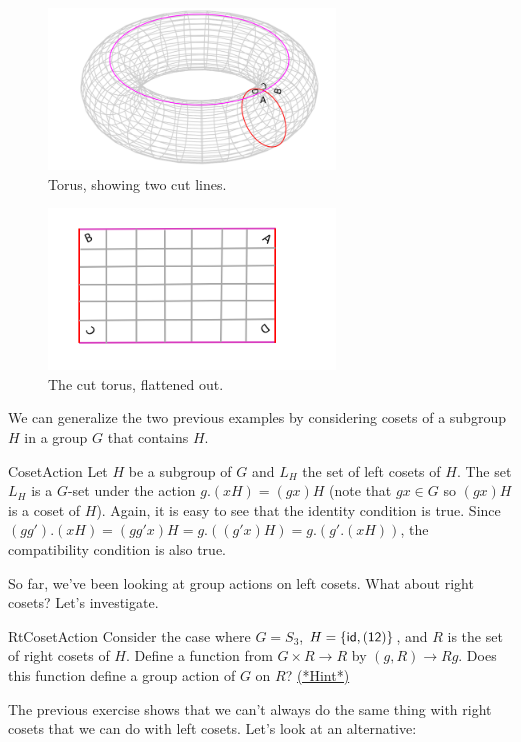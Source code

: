 \begin{figure}[ht]
\begin{center}
\includegraphics[width=3in]{images/Torus1.png}
\caption{Torus, showing two cut lines.}\label{fig:Torus1}
\end{center}
\end{figure}

\begin{figure}[ht]
\begin{center}
\includegraphics[width=3in]{images/Torus2.png}
\caption{The cut torus, flattened out.}\label{fig:Torus2}
\end{center}
\end{figure}

We can generalize the two previous examples by considering cosets of a subgroup $H$ in a group $G$ that contains $H$.

\begin{example}{CosetAction}
Let $H$ be a subgroup of $G$ and $L_H$ the set of left cosets of $H$. The set $L_H$ is a $G$-set under the action 
$g.(xH)=(gx)H$ (note that $gx\in G$ so $(gx)H$ is a coset of $H$).
Again, it is easy to see that the identity condition is true. Since $(gg').(xH) =(gg'x)H=g.((g'x)H)= g.(g'.(xH))$, the compatibility condition is also true.
\end{example}
So far, we've been looking at group actions on left cosets.  What about right cosets?  Let's investigate.

\begin{exercise}{RtCosetAction}
Consider the case where $G=S_3$, $H=\{\sf{id},(12)\}$, and $R$ is the set of right cosets of $H$.  Define a function from $G\times R\rightarrow R$ by $(g,R)\rightarrow Rg$. Does this function define a group action of $G$ on $R$? 
\hyperref[sec:GroupActions:Hints]{(*Hint*)}
\end {exercise}
The previous exercise shows that we can't always do the same thing with right cosets that we can do with left cosets.  Let's look at an alternative:  

